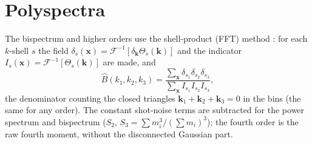\section{Polyspectra}\label{sec:pk-polyspectra}

The bispectrum and higher orders use the shell-product (FFT) method \cite{Scoccimarro2015}: for each $k$-shell $s$ the field
$\delta_s(\bm x)=\mathcal F^{-1}[\delta_{\bm k}\Theta_s(\bm k)]$ and the indicator $I_s(\bm x)=\mathcal F^{-1}[\Theta_s(\bm k)]$ are made, and
\begin{equation}
\hat B(k_1,k_2,k_3)=\frac{\sum_{\bm x}\delta_{s_1}\delta_{s_2}\delta_{s_3}}{\sum_{\bm x}I_{s_1}I_{s_2}I_{s_3}},
\end{equation}
the denominator counting the closed triangles $\bm k_1+\bm k_2+\bm k_3=0$ in the bins (the same for any order). The constant shot-noise terms are
subtracted for the power spectrum and bispectrum ($S_2$, $S_3=\sum m_i^3/(\sum m_i)^3$); the fourth order is the raw fourth moment, without the
disconnected Gaussian part.
